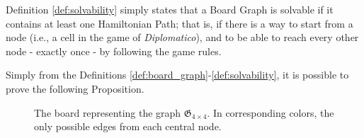\documentclass[conference]{IEEEtran}
\begin{document}
Definition \ref{def:solvability} simply states that a Board Graph is solvable if it contains at least one Hamiltonian Path; that is, if there is a way to start from a node (i.e., a cell in the game of \textit{Diplomatico}), and to be able to reach every other node - exactly once - by following the game rules. 

Simply from the Definitions \ref{def:board_graph}-\ref{def:solvability}, it is possible to prove the following Proposition.

\begin{figure}[ht]
	\centering
	\caption{The board representing the graph $\mathfrak{G}_{4 \times 4}$. In corresponding colors, the only possible edges from each central node.}
	\label{fig:dim_unsolvability_4x4}
\end{figure}
\end{document}
